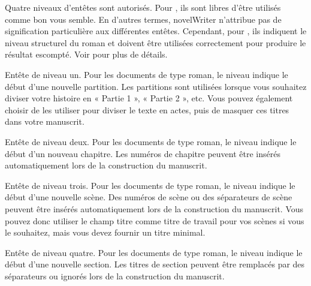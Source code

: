 \documentclass[a4paper,11pt,french]{sphinxmanual}
\begin{document}
\sphinxAtStartPar
Quatre niveaux d’en\sphinxhyphen{}têtes sont autorisés. Pour {\hyperref[\detokenize{int_glossary:term-Project-Notes}]{}}, ils sont libres d’être utilisés comme bon vous semble. En d’autres termes, novelWriter n’attribue pas de signification particulière aux différentes en\sphinxhyphen{}têtes. Cependant, pour {\hyperref[\detokenize{int_glossary:term-Novel-Documents}]{}}, ils indiquent le niveau structurel du roman et doivent être utilisées correctement pour produire le résultat escompté. Voir {\hyperref[\detokenize{project_structure:a-struct-heads}]{}} pour plus de détails.
\begin{description}
\sphinxAtStartPar
En\sphinxhyphen{}tête de niveau un. Pour les documents de type roman, le niveau indique le début d’une nouvelle partition. Les partitions sont utilisées lorsque vous souhaitez diviser votre histoire en « Partie 1 », « Partie 2 », etc. Vous pouvez également choisir de les utiliser pour diviser le texte en actes, puis de masquer ces titres dans votre manuscrit.

\sphinxAtStartPar
En\sphinxhyphen{}tête de niveau deux. Pour les documents de type roman, le niveau indique le début d’un nouveau chapitre. Les numéros de chapitre peuvent être insérés automatiquement lors de la construction du manuscrit.

\sphinxAtStartPar
En\sphinxhyphen{}tête de niveau trois. Pour les documents de type roman, le niveau indique le début d’une nouvelle scène. Des numéros de scène ou des séparateurs de scène peuvent être insérés automatiquement lors de la construction du manuscrit. Vous pouvez donc utiliser le champ titre comme titre de travail pour vos scènes si vous le souhaitez, mais vous devez fournir un titre minimal.

\sphinxAtStartPar
En\sphinxhyphen{}tête de niveau quatre. Pour les documents de type roman, le niveau indique le début d’une nouvelle section. Les titres de section peuvent être remplacés par des séparateurs ou ignorés lors de la construction du manuscrit.

\end{description}
\end{document}
